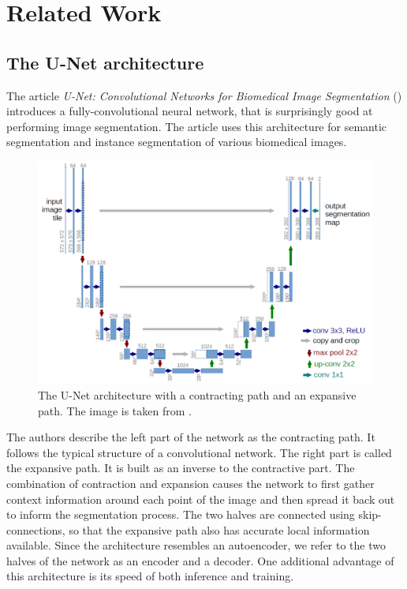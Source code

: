 \chapter{Related Work}
\label{chap:RelatedWork}

\section{The U-Net architecture}

The article \emph{U-Net: Convolutional Networks for Biomedical Image Segmentation} (\cite{UNet}) introduces a fully-convolutional neural network, that is surprisingly good at performing image segmentation. The article uses this architecture for semantic segmentation and instance segmentation of various biomedical images.

\begin{figure}[ht]
    \centering
    \includegraphics[width=145mm]{../img/u-net-architecture.png}
    \caption{The U-Net architecture with a contracting path and an expansive path. The image is taken from \cite{UNet}.}
    \label{fig:UNetArchitecture}
\end{figure}

The authors describe the left part of the network as the contracting path. It follows the typical structure of a convolutional network. The right part is called the expansive path. It is built as an inverse to the contractive part. The combination of contraction and expansion causes the network to first gather context information around each point of the image and then spread it back out to inform the segmentation process. The two halves are connected using skip-connections, so that the expansive path also has accurate local information available. Since the architecture resembles an autoencoder, we refer to the two halves of the network as an encoder and a decoder. One additional advantage of this architecture is its speed of both inference and training.



